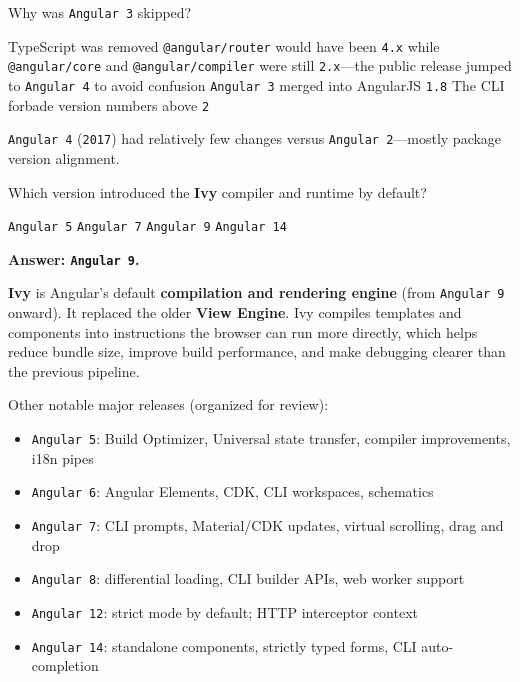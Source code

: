 \question[4]
Why was \texttt{Angular~3} skipped?
\begin{choices}
  \choice TypeScript was removed
  \CorrectChoice \texttt{@angular/router} would have been \texttt{4.x} while \texttt{@angular/core} and \texttt{@angular/compiler} were still \texttt{2.x}---the public release jumped to \texttt{Angular~4} to avoid confusion
  \choice \texttt{Angular~3} merged into AngularJS \texttt{1.8}
  \choice The CLI forbade version numbers above \texttt{2}
\end{choices}
\begin{solution}
  \texttt{Angular~4} (\texttt{2017}) had relatively few changes versus \texttt{Angular~2}---mostly package version alignment.
\end{solution}

\question[4]
Which version introduced the \textbf{Ivy} compiler and runtime by default?
\begin{choices}
  \choice \texttt{Angular~5}
  \choice \texttt{Angular~7}
  \CorrectChoice \texttt{Angular~9}
  \choice \texttt{Angular~14}
\end{choices}
\begin{solution}
  \textbf{Answer: \texttt{Angular~9}.}

  \textbf{Ivy} is Angular's default \textbf{compilation and rendering engine} (from \texttt{Angular~9} onward). It replaced the older \textbf{View Engine}. Ivy compiles templates and components into instructions the browser can run more directly, which helps reduce bundle size, improve build performance, and make debugging clearer than the previous pipeline.

  Other notable major releases (organized for review):
  \begin{itemize}
    \item \texttt{Angular~5}: Build Optimizer, Universal state transfer, compiler improvements, i18n pipes
    \item \texttt{Angular~6}: Angular Elements, CDK, CLI workspaces, schematics
    \item \texttt{Angular~7}: CLI prompts, Material/CDK updates, virtual scrolling, drag and drop
    \item \texttt{Angular~8}: differential loading, CLI builder APIs, web worker support
    \item \texttt{Angular~12}: strict mode by default; HTTP interceptor context
    \item \texttt{Angular~14}: standalone components, strictly typed forms, CLI auto-completion
  \end{itemize}
\end{solution}

